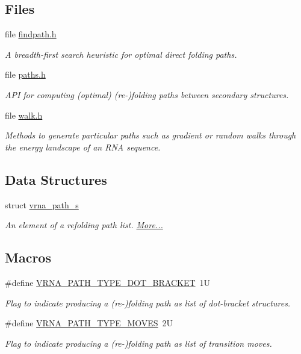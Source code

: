 \subsection*{Files}
\begin{DoxyCompactItemize}
\item 
file \mbox{\hyperlink{landscape_2findpath_8h}{findpath.\+h}}
\begin{DoxyCompactList}\small\item\em A breadth-\/first search heuristic for optimal direct folding paths. \end{DoxyCompactList}\item 
file \mbox{\hyperlink{paths_8h}{paths.\+h}}
\begin{DoxyCompactList}\small\item\em A\+PI for computing (optimal) (re-\/)folding paths between secondary structures. \end{DoxyCompactList}\item 
file \mbox{\hyperlink{landscape_2walk_8h}{walk.\+h}}
\begin{DoxyCompactList}\small\item\em Methods to generate particular paths such as gradient or random walks through the energy landscape of an R\+NA sequence. \end{DoxyCompactList}\end{DoxyCompactItemize}
\subsection*{Data Structures}
\begin{DoxyCompactItemize}
\item 
struct \mbox{\hyperlink{group__paths_structvrna__path__s}{vrna\+\_\+path\+\_\+s}}
\begin{DoxyCompactList}\small\item\em An element of a refolding path list.  \mbox{\hyperlink{group__paths_structvrna__path__s}{More...}}\end{DoxyCompactList}\end{DoxyCompactItemize}
\subsection*{Macros}
\begin{DoxyCompactItemize}
\item 
\#define \mbox{\hyperlink{group__paths_ga3e964156b52440b65fae5e2a48750d8e}{V\+R\+N\+A\+\_\+\+P\+A\+T\+H\+\_\+\+T\+Y\+P\+E\+\_\+\+D\+O\+T\+\_\+\+B\+R\+A\+C\+K\+ET}}~1U
\begin{DoxyCompactList}\small\item\em Flag to indicate producing a (re-\/)folding path as list of dot-\/bracket structures. \end{DoxyCompactList}\item 
\#define \mbox{\hyperlink{group__paths_gaa73703da105dc6c98957fb8247c93f1f}{V\+R\+N\+A\+\_\+\+P\+A\+T\+H\+\_\+\+T\+Y\+P\+E\+\_\+\+M\+O\+V\+ES}}~2U
\begin{DoxyCompactList}\small\item\em Flag to indicate producing a (re-\/)folding path as list of transition moves. \end{DoxyCompactList}\end{DoxyCompactItemize}
